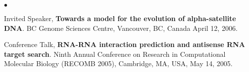 \documentclass[margin,line]{res}
\newenvironment{list2}{
  \begin{list}{$\bullet$}{%
      \setlength{\itemsep}{0.1cm}
      \setlength{\parsep}{0in} \setlength{\parskip}{0in}
      \setlength{\topsep}{0in} \setlength{\partopsep}{0in} 
      \setlength{\leftmargin}{0.2in}}}{\end{list}}
\newcommand{\junk}[1]{}
\begin{document}
\begin{resume}
\begin{list2}
{\item
  Invited Speaker, {\bf Towards a model for the evolution of alpha-satellite DNA}.
  BC Genome Sciences Centre, Vancouver, BC, Canada April 12, 2006.
}

\item  
  Conference Talk, {\bf RNA-RNA interaction prediction and antisense RNA target search}.
  Ninth Annual Conference on Research in Computational Molecular Biology (RECOMB 2005),
  Cambridge, MA, USA, May 14, 2005.

\junk{
\item
 
  Workshop Talk, {\bf RNA-RNA interactions and miRNA target prediction}.
  MITACS-PIMS Pacific Northwest Bioinformatics Day, Simon Fraser University, Burnaby, BC, Canada, 
  May 20, 2004.
}
 
\end{list2}

\clearpage

%
\end{resume}
\end{document}
